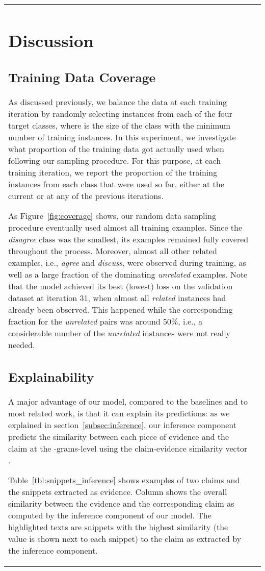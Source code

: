 \documentclass[11pt,a4paper]{article}
\begin{document}
\begin{table}
{\begin{tabularx}{1.15\linewidth}{|lX|}
\section{Discussion}\label{sec:discussion}


\subsection{Training Data Coverage}
\label{dis:Coverage}

As discussed previously, we balance the data at each training iteration by randomly selecting  instances from each of the four target classes,
where  is the size of the class with the minimum number of training instances. In this experiment, we investigate what proportion of the training data got actually used when following our sampling procedure. For this purpose, at each training iteration, we report the proportion of the training instances from each class that were used so far, either at the current or at any of the previous iterations.

\noindent As Figure~\ref{fig:coverage} shows, our random data sampling procedure eventually used almost all training examples. Since the \emph{disagree} class was the smallest, its examples remained fully covered throughout the process. Moreover, almost all other related examples, i.e., \emph{agree} and \emph{discuss}, were observed during training, as well as a large fraction of the dominating \emph{unrelated} examples. 
Note that the model achieved its best (lowest) loss on the validation dataset at iteration 31, when almost all \emph{related} instances had already been observed. This happened while the corresponding fraction for the \emph{unrelated} pairs was around 50\%, i.e., a considerable number of the \emph{unrelated} instances were not really needed.  




\subsection{Explainability}
\label{dis:inference}

A major advantage of our model, compared to the baselines and to most related work, is that it can explain its predictions:
as we explained in section~\ref{subsec:inference}, our inference component predicts the similarity between each piece of evidence  and the claim  at the -grams-level using the claim-evidence similarity vector .

Table~\ref{tbl:snippets_inference} shows examples of two claims and the snippets extracted as evidence. Column  shows the overall similarity between the evidence and the corresponding claim as computed by the inference component of our model. The highlighted texts are snippets with the highest similarity (the value is shown next to each snippet) to the claim as extracted by the inference component. 


\end{tabularx}}
\end{table}
\end{document}
